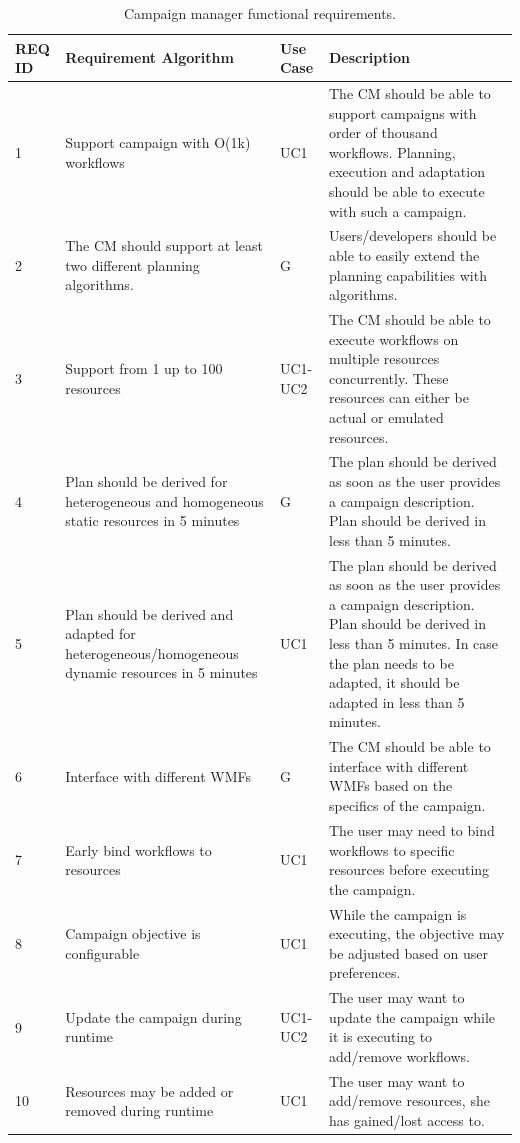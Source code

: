\begin{table}[t]
    \centering
    \scriptsize
    \begin{tabular}{@{}p{1.5cm}|p{2.8cm}p{1.5cm}p{6cm}@{}}
        \toprule
        \textbf{REQ ID} &\textbf{Requirement Algorithm} &\textbf{Use Case} & \textbf{Description} \\
        \midrule
         1 &
         Support campaign with O(1k) workflows &
         UC1 &
         The CM should be able to support campaigns with order of thousand workflows.
         Planning, execution and adaptation should be able to execute with such a campaign.\\
         2 &
         The CM should support at least two different planning algorithms. &
         G &
         Users/developers should be able to easily extend the planning capabilities with algorithms.\\
         3 &
         Support from 1 up to 100 resources &
         UC1-UC2 &
         The CM should be able to execute workflows on multiple resources concurrently.
         These resources can either be actual or emulated resources.\\
         4 &
         Plan should be derived for heterogeneous and homogeneous static resources in 5 minutes &
         G &
         The plan should be derived as soon as the user provides a campaign description.
         Plan should be derived in less than 5 minutes.\\
         5 &
         Plan should be derived and adapted for heterogeneous/homogeneous dynamic resources in 5 minutes &
         UC1 &
         The plan should be derived as soon as the user provides a campaign description.
         Plan should be derived in less than 5 minutes.
         In case the plan needs to be adapted, it should be adapted in less than 5 minutes.\\
         6 &
         Interface with different WMFs &
         G &
         The CM should be able to interface with different WMFs based on the specifics of the campaign. \\
         7 &
         Early bind workflows to resources &
         UC1 &
         The user may need to bind workflows to specific resources before executing the campaign.\\
         8 &
         Campaign objective is configurable &
         UC1 &
         While the campaign is executing, the objective may be adjusted based on user preferences.\\
         9 &
         Update the campaign during runtime &
         UC1-UC2 &
         The user may want to update the campaign while it is executing to add/remove workflows.\\
         10 &
         Resources may be added or removed during runtime &
         UC1 &
         The user may want to add/remove resources, she has gained/lost access to.\\
        \bottomrule
    \end{tabular}
    \caption{Campaign manager functional requirements.\label{tab:fun_reqs}}
\end{table}

